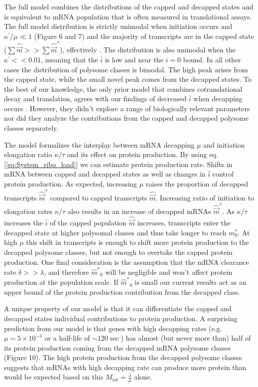 \documentclass[a4,center,fleqn]{NAR}
\newcommand{\kappaprime}{\ensuremath{\kappa^{\prime}}\xspace}
\newcommand{\mhat}{\ensuremath{\hat{m}}\xspace}
\newcommand{\mhatstar}{\ensuremath{\mhat^{*}}\xspace}
\newcommand{\mvec}{\ensuremath{\vec{m}}\xspace}
\newcommand{\mvechat}{\ensuremath{\hat{\mvec}}\xspace}
\newcommand{\mvechatstar}{\ensuremath{\mvechat^*}\xspace}
\newcommand{\MRL}{\ensuremath{\bar{i}}\xspace}
\begin{document}
The full model combines the distributions of the capped and decapped states and is equivalent to mRNA population that is often measured in translational assays.
The full model distribution is strictly unimodal when initiation occurs and $\kappaprime/\mu \ll 1$ (Figure 6 and 7) and the majority of transcripts are in the capped state ($\sum \mvechat >> \sum \mvechatstar$), effectively .
The distribution is also unimodal when the $\kappaprime << 0.01$, meaning that the \MRL is low and near the $i=0$ bound. 
In all other cases the distribution of polysome classes is bimodal. The high peak arises from the capped state, while the small novel  peak comes from the decapped states. 
To the best of our knowledge, the only prior model that combines cotranslational decay and translation, agrees with our findings of decreased \MRL when decapping occurs \citep{RN22}. However, they didn't explore a range of biologically relevant parameters nor did they analyze the contributions from the capped and decapped polysome classes separately.

The model formalizes the interplay between mRNA decapping $\mu$ and initiation elongation ratio $\kappa/\tau$ and its effect on protein production.
By using eq.  [\ref{eq:System_ribo_load}] we can estimate protein production rate.
Shifts in mRNA between capped and decapped states as well as changes in \MRL control protein production.
As expected, increasing $\mu$ raises the proportion of decapped transcripts \mvechatstar compared to capped transcripts \mvechat.
Increasing ratio of initiation to elongation rates $\kappa/\tau$ also results in an increase of decapped mRNAs \mvechatstar.
As $\kappa/\tau$ increases the \MRL of the capped population \mvechat increases, transcripts enter the decapped state at higher polysomal classes and thus take longer to reach $m_0^*$.
At high $\mu$ this shift in transcripts is enough to shift more protein production to the decapped polysome classes, but not enough to overtake the capped protein production.
One final consideration is the assumption that the mRNA clearance rate $\delta >> \lambda$, and therefore $\mhatstar_0$ will be negligible and won't affect protein production at the population scale. If $\mhatstar_0$ is small our current results act as an upper bound of the protein production contribution from the decapped class. 


A unique property of our model is that it can differentiate the capped and decapped states individual contributions to protein production. 
A surprising prediction from our model is that genes with  high decapping rates (e.g. $\mu  \sim 5 \times 10^{-3}$ or a half-life of $\sim 120 \sec$) has almost (but never more than) half of its protein production coming from the decapped mRNA polysome classes (Figure 10).
The high protein production from the decapped polysome classes suggests that mRNAs with high decapping rate can produce more protein than would be expected based on this $M_{tot} = \frac{\lambda}{\mu}$ alone. 
\end{document}
